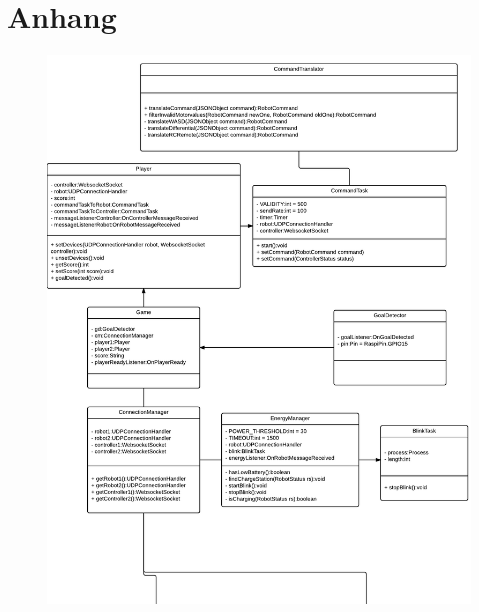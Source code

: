\chapter{Anhang}
\label{ch:anhang}

\begin{figure}[h]
	\includegraphics[page=1,width=\textwidth]{images/uml_software_all.pdf}

\end{figure}
